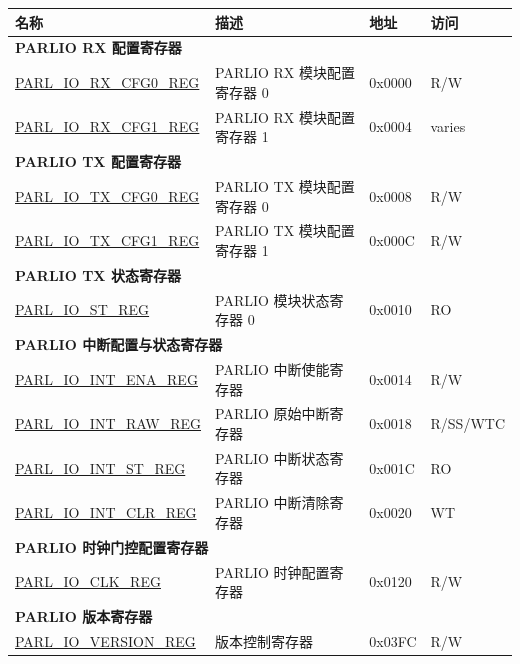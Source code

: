 \begin{longtable}{ | p{4.8cm} | p{7cm} | p{1.3cm} | p{2cm} | }
\hline\rowcolor{lightgray}
\textbf{名称} & \textbf{描述} &  \textbf{地址} & \textbf{访问} \\ \hline
\endhead
\multicolumn{4}{|l|}{\textbf{PARLIO RX 配置寄存器}} \\ \hline
\hyperref[regdesc:PARLIORXCFG0REG]{PARL\_IO\_RX\_CFG0\_REG} & PARLIO RX 模块配置寄存器 0 & 0x0000 & R/W \\ \hline
\hyperref[regdesc:PARLIORXCFG1REG]{PARL\_IO\_RX\_CFG1\_REG} & PARLIO RX 模块配置寄存器 1 & 0x0004 & varies \\ \hline
\multicolumn{4}{|l|}{\textbf{PARLIO TX 配置寄存器}} \\ \hline
\hyperref[regdesc:PARLIOTXCFG0REG]{PARL\_IO\_TX\_CFG0\_REG} & PARLIO TX 模块配置寄存器 0 & 0x0008 & R/W \\ \hline
\hyperref[regdesc:PARLIOTXCFG1REG]{PARL\_IO\_TX\_CFG1\_REG} & PARLIO TX 模块配置寄存器 1 & 0x000C & R/W \\ \hline
\multicolumn{4}{|l|}{\textbf{PARLIO TX 状态寄存器}} \\ \hline
\hyperref[regdesc:PARLIOSTREG]{PARL\_IO\_ST\_REG} & PARLIO 模块状态寄存器 0 & 0x0010 & RO \\ \hline
\multicolumn{4}{|l|}{\textbf{PARLIO 中断配置与状态寄存器}} \\ \hline
\hyperref[regdesc:PARLIOINTENAREG]{PARL\_IO\_INT\_ENA\_REG} & PARLIO 中断使能寄存器 & 0x0014 & R/W \\ \hline
\hyperref[regdesc:PARLIOINTRAWREG]{PARL\_IO\_INT\_RAW\_REG} & PARLIO 原始中断寄存器 & 0x0018 & R/SS/WTC \\ \hline
\hyperref[regdesc:PARLIOINTSTREG]{PARL\_IO\_INT\_ST\_REG} & PARLIO 中断状态寄存器 & 0x001C & RO \\ \hline
\hyperref[regdesc:PARLIOINTCLRREG]{PARL\_IO\_INT\_CLR\_REG} & PARLIO 中断清除寄存器 & 0x0020 & WT \\ \hline
\multicolumn{4}{|l|}{\textbf{PARLIO 时钟门控配置寄存器}} \\ \hline
\hyperref[regdesc:PARLIOCLKREG]{PARL\_IO\_CLK\_REG} & PARLIO 时钟配置寄存器 & 0x0120 & R/W \\ \hline
\multicolumn{4}{|l|}{\textbf{PARLIO 版本寄存器}} \\ \hline
\hyperref[regdesc:PARLIOVERSIONREG]{PARL\_IO\_VERSION\_REG} & 版本控制寄存器 & 0x03FC & R/W \\ \hline
\end{longtable}
